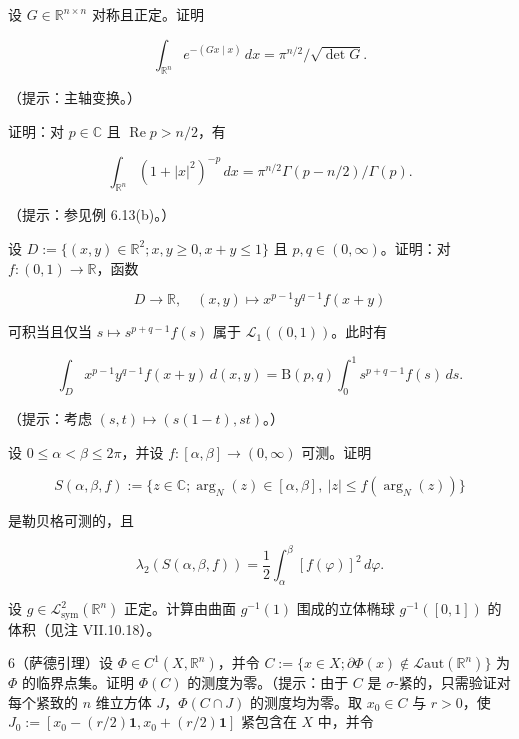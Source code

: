 \begin{exercises}
\item

设 $ G\in\mathbb{R}^{n\times n} $ 对称且正定。证明

\[
\int_{\mathbb{R}^n} e^{-(Gx\mid x)}\,dx=\pi^{n/2}/\sqrt{\det G} .
\]

（提示：主轴变换。）

\item

证明：对 $ p\in\mathbb{C} $ 且 $ \operatorname{Re}p>n/2 $，有

\[
\int_{\mathbb{R}^n} (1+|x|^2)^{-p}\,dx=\pi^{n/2}\Gamma(p-n/2)/\Gamma(p) .
\]

（提示：参见例 6.13(b)。）

\item

设 $ D:=\{(x,y)\in\mathbb{R}^2 ; x,y\ge 0, x+y\le 1\} $ 且 $ p,q\in(0,\infty) $。证明：对 $ f:(0,1)\to\mathbb{R} $，函数

\[
D\to\mathbb{R}, \quad (x,y)\mapsto x^{p-1}y^{q-1}f(x+y)
\]

可积当且仅当 $ s\mapsto s^{p+q-1}f(s) $ 属于 $ \mathcal{L}_1((0,1)) $。此时有

\[
\int_D x^{p-1}y^{q-1}f(x+y)\,d(x,y)=\mathrm{B}(p,q)\int_0^1 s^{p+q-1}f(s)\,ds .
\]

（提示：考虑 $ (s,t)\mapsto(s(1-t),st) $。）

\item

设 $ 0\le\alpha<\beta\le 2\pi $，并设 $ f:[\alpha,\beta]\to(0,\infty) $ 可测。证明

\[
S(\alpha,\beta,f):=\{z\in\mathbb{C} ; \operatorname{arg}_N(z)\in[\alpha,\beta],\ |z|\le f(\operatorname{arg}_N(z))\}
\]

是勒贝格可测的，且

\[
\lambda_2(S(\alpha,\beta,f))=\frac{1}{2}\int_\alpha^\beta [f(\varphi)]^2\,d\varphi .
\]
\item

设 $ g\in\mathcal{L}^2_{\mathrm{sym}}(\mathbb{R}^n) $ 正定。计算由曲面 $ g^{-1}(1) $ 围成的立体椭球 $ g^{-1}([0,1]) $ 的体积（见注 VII.10.18）。

6（萨德引理）设 $ \Phi\in C^1(X,\mathbb{R}^n) $，并令 $ C:=\{x\in X ; \partial\Phi(x)\notin\mathcal{L}\mathrm{aut}(\mathbb{R}^n)\} $ 为 $ \Phi $ 的临界点集。证明 $ \Phi(C) $ 的测度为零。（提示：由于 $ C $ 是 $ \sigma $-紧的，只需验证对每个紧致的 $ n $ 维立方体 $ J $，$ \Phi(C\cap J) $ 的测度均为零。取 $ x_0\in C $ 与 $ r>0 $，使 $ J_0:=[x_0-(r/2)\mathbf{1},x_0+(r/2)\mathbf{1}] $ 紧包含在 $ X $ 中，并令


\end{exercises}
